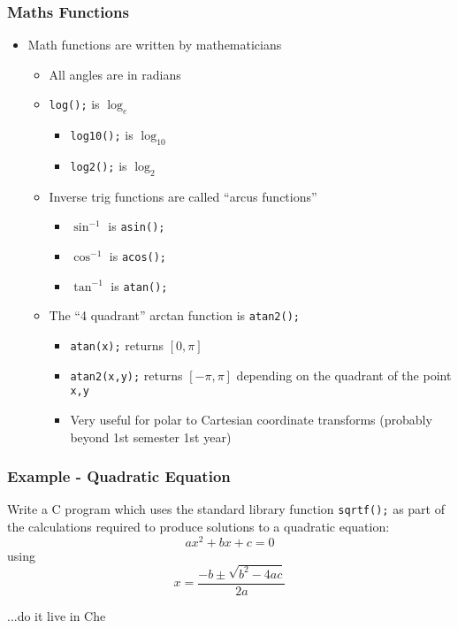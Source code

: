 \documentclass[14pt]{beamer}
\begin{document}
\begin{frame}
\frametitle{Maths Functions}
\begin{itemize}
\item Math functions are written by mathematicians
	\begin{itemize}
		\item All angles are in radians
		\pause
		\item \texttt{log();} is $\log_e$
			\begin{itemize}
				\item \texttt{log10();} is $\log_{10}$
				\item \texttt{log2();} is $\log_2$
			\end{itemize}
		\pause
		\item Inverse trig functions are called ``arcus functions''
			\begin{itemize}
				\item $\sin^{-1}$ is \texttt{asin();}
				\item $\cos^{-1}$ is \texttt{acos();}
				\item $\tan^{-1}$ is \texttt{atan();}
			\end{itemize}
		\pause
		\item The ``4 quadrant'' arctan function is \texttt{atan2();}
			\begin{itemize}
				\item \texttt{atan(x);} returns $[0,\pi]$
				\item \texttt{atan2(x,y);} returns $[-\pi, \pi]$ depending on the quadrant of the point \texttt{x,y}
				\item Very useful for polar to Cartesian coordinate transforms (probably beyond 1st semester 1st year)
			\end{itemize}
	\end{itemize}
\end{itemize}
\end{frame}

\begin{frame}
\frametitle{Example - Quadratic Equation}
Write a C program which uses the standard library function \texttt{sqrtf();} as part of the calculations required to produce solutions to a quadratic equation:
\begin{equation}
ax^2 + bx + c = 0
\end{equation}
using
\begin{equation}
x = \frac{-b \pm \sqrt{b^2 - 4ac}}{2a}
\end{equation}
\end{frame}

\begin{frame}
\begin{center}
...do it live in Che
\end{center}
\end{frame}
\end{document}
